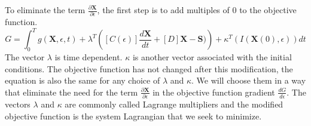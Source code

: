 \documentclass{tufte-handout}
\begin{document}
 To eliminate the term $ \frac{\partial \mathbf{X}}{\partial \epsilon}$, the first step is to  add  multiples of $0$ to the objective function.
 \begin{equation}
G =  \int^T_0 g(\mathbf{X},\epsilon,t)   + \lambda^T \left( [C(\epsilon)] \frac{d \mathbf{X}}{dt} + [D] \mathbf{X} - \mathbf{S}) \right) + \kappa^T\left( I(\mathbf{X}(0),\epsilon) \right) dt
 \end{equation}
 The vector  $\lambda$  is time dependent. $\kappa$  is another vector associated with the initial conditions.   The objective function has not changed after this modification, the equation is also the same  for any choice of $\lambda$ and $\kappa$. We will choose them in a way that eliminate the need for  the term   $ \frac{\partial \mathbf{X}}{\partial \epsilon}$ in the objective function gradient $\frac{dG}{d\epsilon}$. The vectors $\lambda$ and $\kappa$ are commonly called Lagrange multipliers and the modified objective function is the system Lagrangian that we seek to minimize. 
\end{document}
